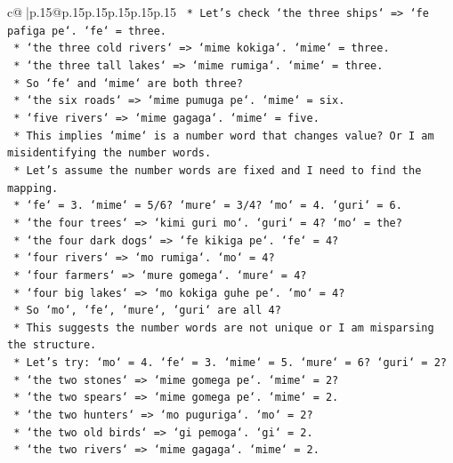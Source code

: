 \documentclass{article}
\begin{document}
{\begin{supertabular}{c@{$\;$}|p{.15\linewidth}@{}p{.15\linewidth}p{.15\linewidth}p{.15\linewidth}p{.15\linewidth}p{.15\linewidth}}
{{{\texttt{        *   Let's check `the three ships` => `fe pafiga pe`. `fe` = three.} \\
\texttt{        *   `the three cold rivers` => `mime kokiga`. `mime` = three.} \\
\texttt{        *   `the three tall lakes` => `mime rumiga`. `mime` = three.} \\
\texttt{        *   So `fe` and `mime` are both three?} \\
\texttt{        *   `the six roads` => `mime pumuga pe`. `mime` = six.} \\
\texttt{        *   `five rivers` => `mime gagaga`. `mime` = five.} \\
\texttt{        *   This implies `mime` is a number word that changes value? Or I am misidentifying the number words.} \\
\texttt{        *   Let's assume the number words are fixed and I need to find the mapping.} \\
\texttt{        *   `fe` = 3. `mime` = 5/6? `mure` = 3/4? `mo` = 4. `guri` = 6.} \\
\texttt{        *   `the four trees` => `kimi guri mo`. `guri` = 4? `mo` = the?} \\
\texttt{        *   `the four dark dogs` => `fe kikiga pe`. `fe` = 4?} \\
\texttt{        *   `four rivers` => `mo rumiga`. `mo` = 4?} \\
\texttt{        *   `four farmers` => `mure gomega`. `mure` = 4?} \\
\texttt{        *   `four big lakes` => `mo kokiga guhe pe`. `mo` = 4?} \\
\texttt{        *   So `mo`, `fe`, `mure`, `guri` are all 4?} \\
\texttt{        *   This suggests the number words are not unique or I am misparsing the structure.} \\
\texttt{        *   Let's try: `mo` = 4. `fe` = 3. `mime` = 5. `mure` = 6? `guri` = 2?} \\
\texttt{        *   `the two stones` => `mime gomega pe`. `mime` = 2?} \\
\texttt{        *   `the two spears` => `mime gomega pe`. `mime` = 2.} \\
\texttt{        *   `the two hunters` => `mo puguriga`. `mo` = 2?} \\
\texttt{        *   `the two old birds` => `gi pemoga`. `gi` = 2.} \\
\texttt{        *   `the two rivers` => `mime gagaga`. `mime` = 2.} \\
}}}
\end{supertabular}}
\end{document}
